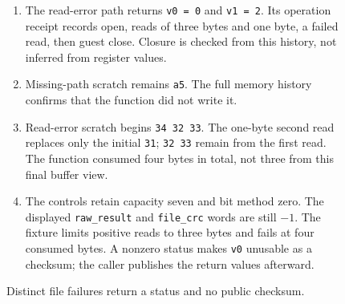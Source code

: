 \begin{figure}[htbp]
\begin{minipage}{\linewidth}
\begin{enumerate}
      \item The read-error path returns \texttt{v0 = 0} and \texttt{v1 = 2}. Its operation receipt records open, reads of three bytes and one byte, a failed read, then guest close. Closure is checked from this history, not inferred from register values.
      \item Missing-path scratch remains \texttt{a5}. The full memory history confirms that the function did not write it.
      \item Read-error scratch begins \texttt{34 32 33}. The one-byte second read replaces only the initial \texttt{31}; \texttt{32 33} remain from the first read. The function consumed four bytes in total, not three from this final buffer view.
      \item The controls retain capacity seven and bit method zero. The displayed \texttt{raw\_result} and \texttt{file\_crc} words are still $-1$. The fixture limits positive reads to three bytes and fails at four consumed bytes. A nonzero status makes \texttt{v0} unusable as a checksum; the caller publishes the return values afterward.
    \end{enumerate}
  \end{minipage}
  \caption{Distinct file failures return a status and no public checksum.}
  \label{capture:024-crc32-f04}
  \label{crc-f04}
\end{figure}
\par
